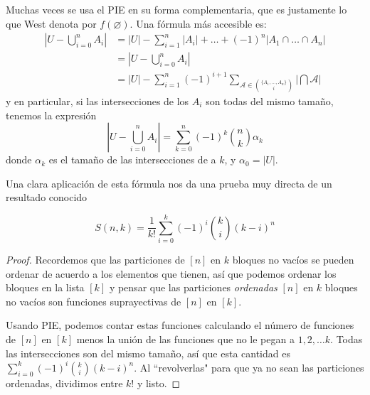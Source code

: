 \documentclass[spanish]{book}
\theoremstyle{definition}
\begin{document}
Muchas veces se usa el PIE en su forma complementaria, que es justamente lo que West denota por $f(\varnothing)$. Una fórmula más accesible es:
\begin{align*}
	\left|U-\bigcup_{i=0}^nA_i\right|&=|U|-\sum_{i=1}^n|A_i|+\ldots+(-1)^n|A_1\cap\ldots\cap A_n|\\
	&=\left|U-\bigcup_{i=0}^nA_i\right|\\
	&=|U|-\sum_{i=1}^n(-1)^{i+1}\sum_{\mathcal{A}\in{\{A_1,\ldots,A_n\}\choose i}}\left|\bigcap \mathcal{A}\right|\end{align*}
y en particular, si las intersecciones de los $A_i$ son todas del mismo tamaño, tenemos la expresión
\[\left|U-\bigcup_{i=0}^nA_i\right|=\sum_{k=0}^n(-1)^k{n\choose k}\alpha_k\]
donde $\alpha_k$ es el tamaño de las intersecciones de a $k$, y $\alpha_0=|U|$.

Una clara aplicación de esta fórmula nos da una prueba muy directa de un resultado conocido
\begin{teo}
	\[S(n,k)=\frac{1}{k!}\sum_{i=0}^k(-1)^i{k\choose i}(k-i)^n\]
\end{teo}
\begin{proof}
	Recordemos que las particiones de $[n]$ en $k$ bloques no vacíos se pueden ordenar de acuerdo a los elementos que tienen, así que podemos ordenar los bloques en la lista $[k]$ y pensar que las particiones \textit{ordenadas} $[n]$ en $k$ bloques no vacíos son funciones suprayectivas de $[n]$ en $[k]$.
	
	Usando PIE, podemos contar estas funciones calculando el número de funciones de $[n]$ en $[k]$ menos la unión de las funciones que no le pegan a $1,2,\ldots k$. Todas las intersecciones son del mismo tamaño, así que esta cantidad es $\sum_{i=0}^k(-1)^i{k\choose i}(k-i)^n$. Al ``revolverlas" para que ya no sean las particiones ordenadas, dividimos entre $k!$ y listo.
\end{proof}
\end{document}
